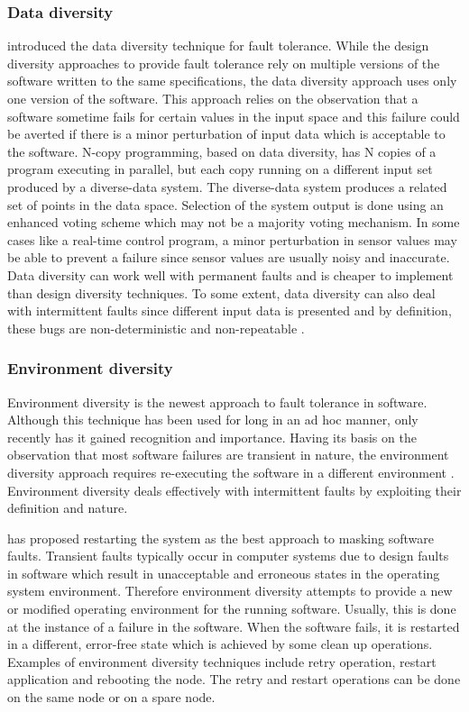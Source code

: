 \documentclass[a4paper, 11pt]{article}
\begin{document}
\subsubsection{Data diversity}
\citet{ammann1988data} introduced the data diversity technique for fault tolerance. While the design diversity approaches to provide fault tolerance rely on multiple versions of the software written to the same specifications, the data diversity approach uses only one version of the software. This approach relies on the observation that a software sometime fails for certain values in the input space and this failure could be averted if there is a minor perturbation of input data which is acceptable to the software. N-copy programming, based on data diversity, has N copies of a program executing in parallel, but each copy running on a different input set produced by a diverse-data system. The diverse-data system produces a related set of points in the data space. Selection of the system output is done using an enhanced voting scheme which may not be a majority voting mechanism. In some cases like a real-time control program, a minor perturbation in sensor values may be able to prevent a failure since sensor values are usually noisy and inaccurate. Data diversity can work well with permanent faults and is cheaper to implement than design diversity techniques. To some extent, data diversity can also deal with intermittent faults since different input data is presented and by definition, these bugs are non-deterministic and non-repeatable \citep{kapur2011software}.

\subsubsection{Environment diversity}
\label{sec:envdiv}
Environment diversity is the newest approach to fault tolerance in software. Although this technique has been used for long in an ad hoc manner, only recently has it gained recognition and importance. Having its basis on the observation that most software failures are transient in nature, the environment diversity approach requires re-executing the software in a different environment \citep{jalote1995framework}. Environment diversity deals effectively with intermittent faults by exploiting their definition and nature.

\citet{adams1984optimizing} has proposed restarting the system as the best approach to masking software faults. Transient faults typically occur in computer systems due to design faults in software which result in unacceptable and erroneous states in the operating system environment. Therefore environment diversity attempts to provide a new or modified operating environment for the running software. Usually, this is done at the instance of a failure in the software. When the software fails, it is restarted in a different, error-free state which is achieved by some clean up operations. Examples of environment diversity techniques include retry operation, restart application and rebooting the node. The retry and restart operations can be done on the same node or on a spare node.
\end{document}
